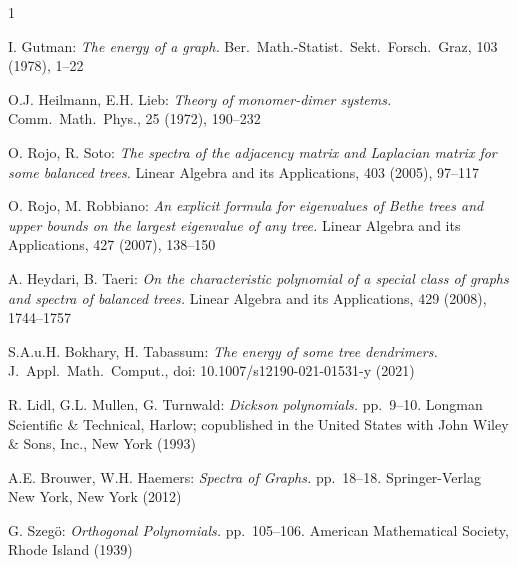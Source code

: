 \documentclass[a4paper]{amsart}
\begin{document}
\begin{thebibliography}{1}

{\sc I. Gutman:}
{\it The energy of a graph.}
Ber.\ Math.-Statist.\ Sekt.\ Forsch.\ Graz, 103 (1978), 1--22

{\sc O.J. Heilmann, E.H. Lieb:}
{\it Theory of monomer-dimer systems.}
Comm.\ Math.\ Phys., 25 (1972), 190--232

{\sc O. Rojo, R. Soto:}
{\it The spectra of the adjacency matrix and Laplacian matrix for some balanced trees.} Linear Algebra and its Applications, 403 (2005), 97--117

{\sc O. Rojo, M. Robbiano:}
{\it An explicit formula for eigenvalues of Bethe trees and upper bounds on the largest eigenvalue of any tree.}
Linear Algebra and its Applications, 427 (2007), 138--150

{\sc A. Heydari, B. Taeri:}
{\it On the characteristic polynomial of a special class of graphs and spectra of balanced trees.}
Linear Algebra and its Applications, 429 (2008), 1744--1757

{\sc S.A.u.H. Bokhary, H. Tabassum:}
{\it The energy of some tree dendrimers.}
J.\ Appl.\ Math.\ Comput., doi: 10.1007/s12190-021-01531-y (2021)

{\sc R. Lidl, G.L. Mullen, G. Turnwald:}
{\it Dickson polynomials.}
pp.\ 9--10. Longman Scientific \& Technical, Harlow; copublished in the United States with John Wiley \& Sons, Inc., New York (1993)

{\sc A.E. Brouwer, W.H. Haemers:}
{\it Spectra of Graphs.}
pp.\ 18--18. Springer-Verlag New York, New York (2012)

{\sc G. Szeg\"{o}:}
{\it Orthogonal Polynomials.}
pp.\ 105--106. American Mathematical Society, Rhode Island (1939)

\end{thebibliography}
\end{document}
